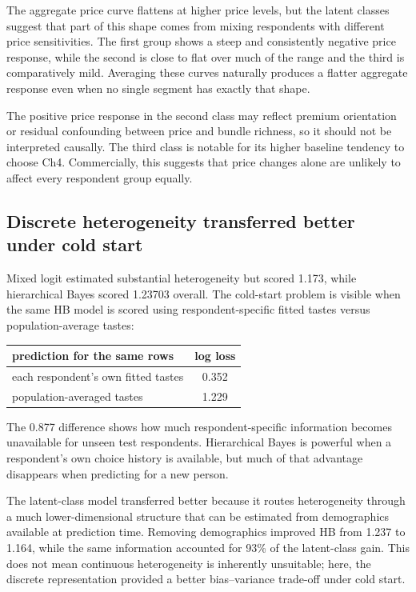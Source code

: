 \documentclass[11pt]{article}
\begin{document}
The aggregate price curve flattens at higher price levels, but the latent classes suggest
that part of this shape comes from mixing respondents with different price sensitivities.
The first group shows a steep and consistently negative price response, while the second
is close to flat over much of the range and the third is comparatively mild. Averaging
these curves naturally produces a flatter aggregate response even when no single segment
has exactly that shape.

The positive price response in the second class may reflect premium orientation or
residual confounding between price and bundle richness, so it should not be interpreted
causally. The third class is notable for its higher baseline tendency to choose Ch4.
Commercially, this suggests that price changes alone are unlikely to affect every
respondent group equally.

\subsection{Discrete heterogeneity transferred better under cold start}

Mixed logit estimated substantial heterogeneity but scored 1.173, while hierarchical
Bayes scored 1.23703 overall. The cold-start problem is visible when the same HB model is
scored using respondent-specific fitted tastes versus population-average tastes:

\begin{center}\small
\begin{tabular}{lc}
\toprule
prediction for the same rows & log loss \\
\midrule
each respondent's own fitted tastes & 0.352 \\
population-averaged tastes & 1.229 \\
\bottomrule
\end{tabular}
\end{center}

The 0.877 difference shows how much respondent-specific information becomes unavailable
for unseen test respondents. Hierarchical Bayes is powerful when a respondent's own
choice history is available, but much of that advantage disappears when predicting for a
new person.

The latent-class model transferred better because it routes heterogeneity through a much
lower-dimensional structure that can be estimated from demographics available at
prediction time. Removing demographics improved HB from 1.237 to 1.164, while the same
information accounted for 93\% of the latent-class gain. This does not mean continuous
heterogeneity is inherently unsuitable; here, the discrete representation provided a
better bias--variance trade-off under cold start.
\end{document}
